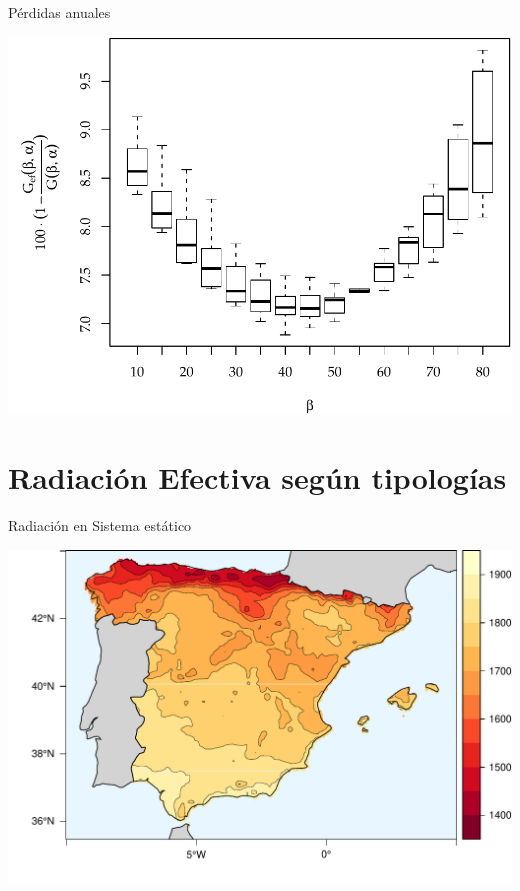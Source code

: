 \documentclass[xcolor={usenames,svgnames,dvipsnames}]{beamer}
\begin{document}
\begin{frame}[label={sec:org0bc6d2a}]{Pérdidas anuales}
\begin{center}
\includegraphics[width=.9\linewidth]{../figs/GefVSG.pdf}
\end{center}
\end{frame}

\section{Radiación Efectiva según tipologías}
\label{sec:org6561874}



\begin{frame}[label={sec:org8610eff}]{Radiación en Sistema estático}
\begin{center}
\includegraphics[width=.9\linewidth]{../figs/FixedKrig.pdf}
\end{center}
\end{frame}
\end{document}

